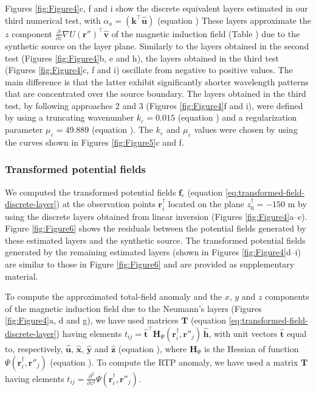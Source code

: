 Figures \ref{fig:Figure4}c, f and i show the discrete equivalent layers estimated in our 
third numerical test, with $\alpha_{a} = \left(\mathbf{k}^{\top} \hat{\mathbf{u}} \right)$ 
(equation ) 
These layers approximate the $z$ component 
$\frac{\partial}{\partial z}\nabla U(\mathbf{r}'')^{\top} \hat{\mathbf{v}}$
of the magnetic induction field (Table ) due to the synthetic source on the 
layer plane.
Similarly to the layers obtained in the second test (Figures \ref{fig:Figure4}b, e and h), 
the layers obtained in the third test (Figures \ref{fig:Figure4}c, f and i) oscillate from
negative to positive values. 
The main difference is that the latter exhibit significantly shorter wavelength patterns that
are concentrated over the source boundary.
The layers obtained in the third test, by following approaches 2 and 3 
(Figures \ref{fig:Figure4}f and i), were defined by using a truncating wavenumber 
$k_{\varepsilon} = 0.015$ (equation )
and a regularization parameter $\mu_{\varepsilon} = 49.889$ 
(equation ). 
The $k_{\varepsilon}$ and $\mu_{\varepsilon}$ values were chosen by using the curves shown 
in Figures \ref{fig:Figure5}c and f.

\subsubsection{Transformed potential fields}

We computed the transformed potential fields $\mathbf{f}_{\epsilon}$ (equation \ref{eq:transformed-field-discrete-layer}) 
at the observation points $\mathbf{r}^{\dagger}_{i}$ located on the plane $z^{\dagger}_{0} = -150$ m by using the discrete 
layers obtained from linear inversion (Figures \ref{fig:Figure4}a–c). Figure \ref{fig:Figure6} shows the residuals 
between the potential fields generated by these estimated layers and the synthetic source. The transformed potential 
fields generated by the remaining estimated layers (shown in Figures \ref{fig:Figure4}d–i) are similar to those in Figure 
\ref{fig:Figure6} and are provided as supplementary material.

To compute the approximated total-field anomaly and the $x$, $y$ and $z$ components of the magnetic induction field 
due to the Neumann's layers (Figures \ref{fig:Figure4}a, d and g), 
we have used matrices $\mathbf{T}$ (equation \ref{eq:transformed-field-discrete-layer}) 
having elements $t_{ij} = \hat{\mathbf{t}}^{\top} \mathbf{H}_{\Psi}(\mathbf{r}^{\dagger}_{i}, \mathbf{r}''_{j}) \, \hat{\mathbf{h}}$,
with unit vectors $\hat{\mathbf{t}}$ equal to, respectively, $\hat{\mathbf{u}}$, $\hat{\mathbf{x}}$, $\hat{\mathbf{y}}$ and
$\hat{\mathbf{z}}$ (equation ), 
where $\mathbf{H}_{\Psi}$ is the Hessian of function $\Psi(\mathbf{r}^{\dagger}_{i}, \mathbf{r}''_{j})$
(equation ).
To compute the RTP anomaly, we have used a matrix $\mathbf{T}$ 
having elements $t_{ij} = \tfrac{\partial^{2}}{\partial z^{2}} \Psi(\mathbf{r}^{\dagger}_{i}, \mathbf{r}''_{j})$.

